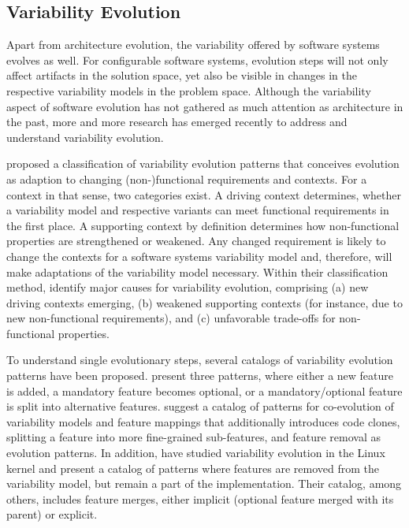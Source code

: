 \subsection{Variability Evolution}
Apart from architecture evolution, the variability offered by software systems
evolves as well. For configurable software systems,
evolution steps will not only affect artifacts in the solution space, yet also
be visible in changes in the respective variability models in the problem space.
Although the variability aspect of software evolution has not gathered as
much attention as architecture in the past, more and more
research has emerged recently to address and understand variability evolution.

\cite{peng_analyzing_2011} proposed a classification of variability evolution patterns that
conceives evolution as adaption to changing (non-)functional requirements and
contexts. For a context in that sense, two categories exist. A driving context
determines, whether a variability model and respective variants can meet
functional requirements in the first place. A supporting context by definition
determines how non-functional properties are strengthened or weakened. 
Any changed requirement is likely to change the contexts for a software systems
variability model and, therefore, will make adaptations of the variability
model necessary. Within their classification method, \cite{peng_analyzing_2011} identify major
causes for variability evolution, comprising (a) new driving contexts emerging,
(b) weakened supporting contexts (for instance, due to new non-functional 
requirements), and (c) unfavorable trade-offs for non-functional properties.

To understand single evolutionary steps, several catalogs of variability
evolution patterns have been proposed. \cite{peng_analyzing_2011} present three patterns,
where either a new feature is added, a mandatory feature becomes optional, or a
mandatory/optional feature is split into alternative features. \cite{seidl_co-evolution_2012} suggest a catalog of
patterns for co-evolution of variability models and feature mappings that additionally introduces code clones, splitting a feature
into more fine-grained sub-features, and feature removal as evolution patterns.
In addition, \cite{passos_towards_2012} have studied variability evolution in
the Linux kernel and present a catalog of patterns where features are removed from the
variability model, but remain a part of the implementation. Their
catalog, among others, includes feature merges, either implicit (optional feature merged
with its parent) or explicit.

